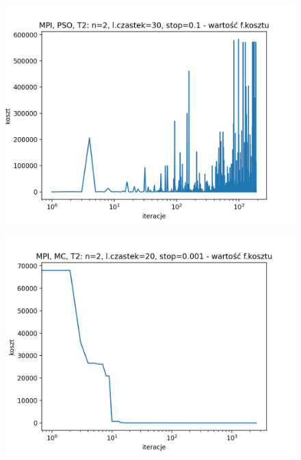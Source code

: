 \documentclass[11pt, a4paper, oneside]{article}
\begin{document}
\begin{figure}[H]
\begin{minipage}[b]{\dimexpr.5\textwidth-1em}
  \label{fig:pozycjeStartowe:MC1}
\end{minipage}
\end{figure}

\begin{figure}[H]
\centering
\begin{minipage}[b]{\dimexpr.5\textwidth-1em}
  \centering
  \includegraphics[width=1\linewidth]{grafiki2/MPI_PSO_T2/MPI_PSO_T2_koszt.png}
  \label{fig:pozycjeStartowe:PSO2}
\end{minipage} \hfill
\begin{minipage}[b]{\dimexpr.5\textwidth-1em}
  \centering
  \includegraphics[width=1\linewidth]{grafiki2/MPI_MC_T2/MPI_MC_T2_koszt.png}
  \label{fig:pozycjeStartowe:MC2}
\end{minipage}
\end{figure}
\end{document}
